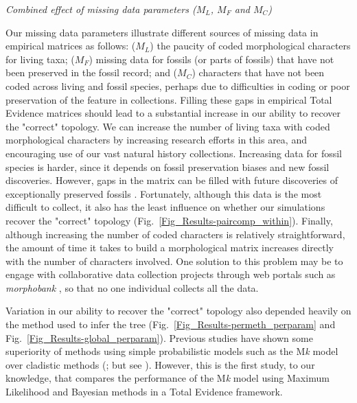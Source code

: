 \documentclass[12pt,letterpaper]{article}
\renewcommand{\subsection}[1]{%
\bigskip
\begin{center}
\begin{large}
\normalfont\itshape #1
\end{large}
\end{center}}
\begin{document}
\subsection{Combined effect of missing data parameters ($M_{L}$, $M_{F}$ and $M_{C}$)} 

Our missing data parameters illustrate different sources of missing data in empirical matrices as follows: ($M_{L}$) the paucity of coded morphological characters for living taxa; ($M_{F}$) missing data for fossils (or parts of fossils) that have not been preserved in the fossil record; and ($M_{C}$) characters that have not been coded across living and fossil species, perhaps due to difficulties in coding or poor preservation of the feature in collections. Filling these gaps in empirical Total Evidence matrices should lead to a substantial increase in our ability to recover the "correct" topology. We can increase the number of living taxa with coded morphological characters by increasing research efforts in this area, and encouraging use of our vast natural history collections. Increasing data for fossil species is harder, since it depends on fossil preservation biases and new fossil discoveries. However, gaps in the matrix can be filled with future discoveries of exceptionally preserved fossils \citep[e.g.][]{nithe2013}. Fortunately, although this data is the most difficult to collect, it also has the least influence on whether our simulations recover the "correct" topology (Fig.~\ref{Fig_Results-paircomp_within}). Finally, although increasing the number of coded characters is relatively straightforward, the amount of time it takes to build a morphological matrix increases directly with the number of characters involved. One solution to this problem may be to engage with collaborative data collection projects through web portals such as \textit{morphobank} \citep{morphobank}, so that no one individual collects all the data.


Variation in our ability to recover the "correct" topology also depended heavily on the method used to infer the tree (Fig.~\ref{Fig_Results-permeth_perparam} and Fig.~\ref{Fig_Results-global_perparam}). Previous studies have shown some superiority of methods using simple probabilistic models such as the M\textit{k} model \citep{lewisa2001} over cladistic methods (\citealt{wrightbayesian2014}; but see \citealt{spencerefficacy2013}). However, this is the first study, to our knowledge, that compares the performance of the M\textit{k} model \citep{lewisa2001} using Maximum Likelihood and Bayesian methods in a Total Evidence framework. %
\end{document}
